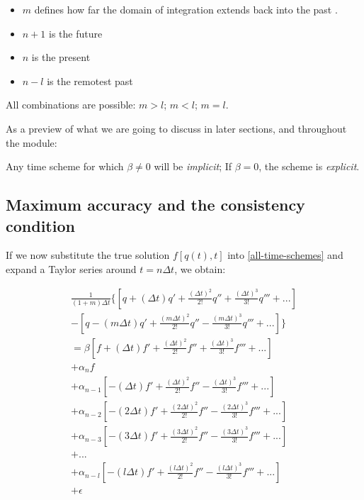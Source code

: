 \begin{itemize}
	\item $m$ defines how far the domain of integration extends back into the past .
	\item $n+1$ is the future
	\item $n$ is the present
	\item $n-l$ is the remotest past
\end{itemize}	

All combinations are possible: $m>l$;  $m<l$; $m=l$.

As a preview of what we are going to discuss in later sections, and throughout the module:

\begin{definition}		
 Any time scheme for which $\beta \ne 0$ will be \emph{implicit}; If $\beta = 0$, the scheme is \emph{explicit}.
 \end{definition}

\newpage
\subsection{Maximum accuracy and the consistency condition}

If we now substitute the true solution $f[q(t),t]$ into \ref{all-time-schemes} and expand a Taylor series around $t=n \Delta t$, we obtain:

\begin{multline}
\frac{1}{(1+m) \Delta t}
       \{ \left[ q +     ( \Delta t) q' +  \frac{( \Delta t)^2}    {2!} q'' +  \frac{(    \Delta t)^3}{3!} q''' + ... \right] \\
	- \left[ q - (m \Delta t) q'  + \frac{(m \Delta t)^2}{2!} q'' -    \frac{(m \Delta t)^3}{3!} q'''  + ...  \right] \}
	    \\
	= \beta \left[ f +  (\Delta t) f'   + \frac{(\Delta t)^2}{2!} f'' +  \frac{(\Delta t)^3}{3!} f'''            + ... \right]  \\    
	+ \alpha_n f \\
	+  \alpha_{n-1}  \left[ - (\Delta t) f'      +    \frac{(\Delta t)^2}   {2!} f'' -        \frac{( \Delta t)^3}{3!} f'''    + ... \right]    \\
	+  \alpha_{n-2}  \left[ - (2 \Delta t) f'  +    \frac{(2 \Delta t)^2}{2!} f'' -    \frac{(2 \Delta t)^3}{3!} f'''  + ...   \right]    \\
	+  \alpha_{n-3}  \left[ - (3 \Delta t) f'  +    \frac{(3 \Delta t)^2}{2!} f'' -    \frac{(3 \Delta t)^3}{3!} f'''  + ...  \right]    \\
	+ ... \\
	+  \alpha_{n-l}  \left[ - (l \Delta t) f'  +    \frac{(l \Delta t)^2}{2!} f'' -    \frac{(l \Delta t)^3}{3!} f''' + ...  \right]    \\	
	+  \epsilon \\
\end{multline}

